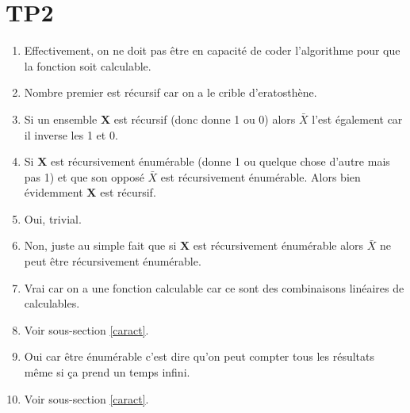 \documentclass{report}
\begin{document}
\section{TP2}
\begin{enumerate}
\item Effectivement, on ne doit pas être en capacité de coder l'algorithme pour que la fonction soit calculable.
\item Nombre premier est récursif car on a le crible d'eratosthène.
\item Si un ensemble $\textbf{X}$ est récursif (donc donne 1 ou 0) alors $\bar{X}$ l'est également car il inverse les 1 et 0.
\item Si $\textbf{X}$ est récursivement énumérable (donne 1 ou quelque chose d'autre mais pas 1) et que son opposé $\bar{X}$ est récursivement énumérable. Alors bien évidemment $\textbf{X}$ est récursif.
\item Oui, trivial.
\item Non, juste au simple fait que si $\textbf{X}$ est récursivement énumérable alors $\bar{X}$ ne peut être récursivement énumérable.
\item Vrai car on a une fonction calculable car ce sont des combinaisons linéaires de calculables.
\item Voir sous-section \ref{caract}.
\item Oui car être énumérable c'est dire qu'on peut compter tous les résultats même si ça prend un temps infini.
\item Voir sous-section \ref{caract}.
\end{enumerate}
\end{document}
